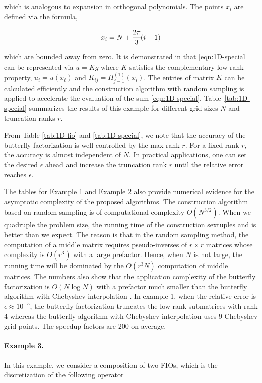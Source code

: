 which is analogous to expansion in orthogonal polynomials.  The points $x_i$ are defined via the formula,

\begin{equation}
  x_i = N+\cfrac{2\pi}{3}(i-1)
\end{equation}

which are bounded away from zero. It is demonstrated in \cite{Butterfly2} that \eqref{eqn:1D-special} can be represented via $u=Kg$ where $K$ satisfies the complementary low-rank property, $u_i=u(x_i)$ and $K_{ij} = H^{(1)}_{j-1}(x_i)$.  The entries of matrix $K$ can be calculated efficiently and the construction algorithm with random sampling is applied to accelerate the evaluation of the sum \eqref{eqn:1D-special}.  Table~\ref{tab:1D-special}
summarizes the results of this example for different grid sizes $N$ and truncation ranks $r$.

From Table \ref{tab:1D-fio} and \ref{tab:1D-special}, we note that the accuracy of the butterfly factorization is well controlled by the max rank $r$.  For a fixed rank $r$, the accuracy is almost independent of $N$.  In practical applications, one can set the desired $\epsilon$
ahead and increase the truncation rank $r$ until the relative error reaches $\epsilon$.

The tables for Example 1 and Example 2 also provide numerical evidence for the asymptotic complexity of the proposed algorithms. The construction algorithm based on random sampling is of computational complexity $O(N^{3/2})$. When we quadruple the problem size, the running time of the construction sextuples and is better than we expect.  The reason is that in the random sampling method, the computation of a middle matrix requires pseudo-inverses of $r \times r$ matrices whose complexity is $O(r^3)$ with a large prefactor.  Hence, when $N$ is not large, the running time will be dominated by the $O(r^3N)$ computation of middle matrices.  The numbers also show that the application complexity of the butterfly factorization is $O(N\log N)$ with a prefactor much smaller than the butterfly algorithm with {Chebyshev} interpolation \cite{FIO09}. In example 1, when the relative error is $\epsilon\approx 10^{-5}$, the butterfly factorization truncates the low-rank submatrices with rank 4 whereas the butterfly algorithm with {Chebyshev} interpolation uses 9 {Chebyshev} grid points. The speedup factors are 200 on average.

\paragraph{Example 3.} In this example, we consider a composition of two {FIOs}, which is the discretization of the following operator

